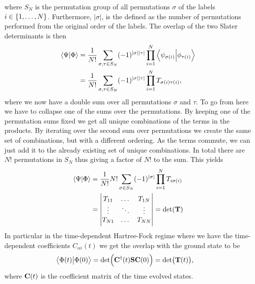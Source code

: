         where $S_N$ is the permutation group of all permutations $\sigma$ of the
        labels $i \in \left\{ 1, \dots, N \right\}$. Furthermore, $|\sigma|$, is the
        defined as the number of permutations performed from the original order
        of the labels. The overlap of the two Slater determinants is then
        \begin{align}
            \braket{\Psi}{\Phi}
            &= \frac{1}{N!}
            \sum_{\sigma, \tau \in S_{N}}
            (-1)^{|\sigma||\tau|}
            \prod_{i = 1}^{N}
            \braket{\psi_{\sigma(i)}}{\phi_{\tau(i)}}
            \\
            &= \frac{1}{N!}
            \sum_{\sigma, \tau \in S_{N}}
            (-1)^{|\sigma||\tau|}
            \prod_{i = 1}^{N}
            T_{\sigma(i)\tau(i)},
        \end{align}
        where we now have a double sum over all permutations $\sigma$ and
        $\tau$. To go from here we have to collapse one of the sums over the
        permutations. By keeping one of the permutation sums fixed we get all
        unique combinations of the terms in the products. By iterating over the
        second sum over permutations we create the same set of combinations, but
        with a different ordering. As the terms commute, we can just add it to
        the already existing set of unique combinations. In total there are $N!$
        permutations in $S_N$ thus giving a factor of $N!$ to the sum. This
        yields
        \begin{align}
            \braket{\Psi}{\Phi}
            &= \frac{1}{N!}N!
            \sum_{\sigma \in S_N}
            (-1)^{|\sigma|}
            \prod_{i = 1}^{N}T_{i\sigma(i)}
            \\
            &= \begin{vmatrix}
                T_{11} & \dots & T_{1N} \\
                \vdots & \ddots & \vdots \\
                T_{N1} & \dots & T_{NN}
            \end{vmatrix}
            = \det(\mathbf{T})
        \end{align}
        In particular in the time-dependent Hartree-Fock regime where we have
        the time-dependent coefficients $C_{\alpha i}(t)$ we get the overlap
        with the ground state to be
        \begin{align}
            \braket{\Phi(t)}{\Phi(0)}
            &= \det(\mathbf{C}^{\dagger}(t)\mathbf{S}\mathbf{C}(0))
            = \det(\mathbf{T}(t)),
        \end{align}
        where $\mathbf{C}(t)$ is the coefficient matrix of the time evolved states.

